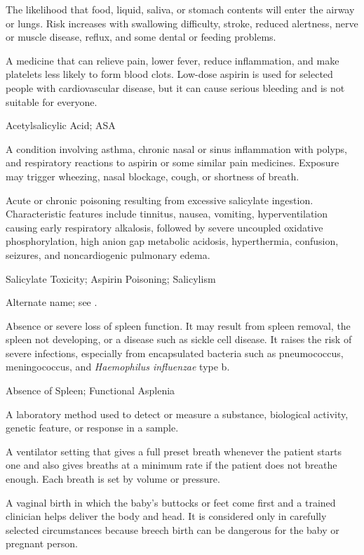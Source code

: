  The likelihood that food, liquid, saliva, or stomach contents will enter the airway or lungs. Risk increases with swallowing difficulty, stroke, reduced alertness, nerve or muscle disease, reflux, and some dental or feeding problems.

 A medicine that can relieve pain, lower fever, reduce inflammation, and make platelets less likely to form blood clots. Low-dose aspirin is used for selected people with cardiovascular disease, but it can cause serious bleeding and is not suitable for everyone.

\synonyms
Acetylsalicylic Acid; ASA

 A condition involving asthma, chronic nasal or sinus inflammation with polyps, and respiratory reactions to aspirin or some similar pain medicines. Exposure may trigger wheezing, nasal blockage, cough, or shortness of breath.

 Acute or chronic poisoning resulting from excessive salicylate ingestion. Characteristic features include tinnitus, nausea, vomiting, hyperventilation causing early respiratory alkalosis, followed by severe uncoupled oxidative phosphorylation, high anion gap metabolic acidosis, hyperthermia, confusion, seizures, and noncardiogenic pulmonary edema.

\synonyms
Salicylate Toxicity; Aspirin Poisoning; Salicylism

 Alternate name; see .

 Absence or severe loss of spleen function. It may result from spleen removal, the spleen not developing, or a disease such as sickle cell disease. It raises the risk of severe infections, especially from encapsulated bacteria such as pneumococcus, meningococcus, and \textit{Haemophilus influenzae} type b.

\synonyms
Absence of Spleen; Functional Asplenia

 A laboratory method used to detect or measure a substance, biological activity, genetic feature, or response in a sample.

 A ventilator setting that gives a full preset breath whenever the patient starts one and also gives breaths at a minimum rate if the patient does not breathe enough. Each breath is set by volume or pressure.

 A vaginal birth in which the baby’s buttocks or feet come first and a trained clinician helps deliver the body and head. It is considered only in carefully selected circumstances because breech birth can be dangerous for the baby or pregnant person.

